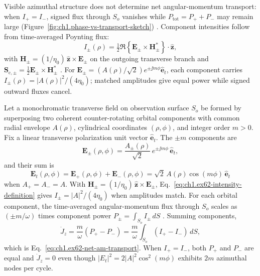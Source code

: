 Visible azimuthal structure does not determine net angular-momentum transport: when \(I_+=I_-\), signed flux through $S_o$ vanishes while $P_{\mathrm{tot}}=P_++P_-$ may remain large (Figure~\ref{fig:ch1.phase-vs-transport-sketch}) \cite{beth1936,stratton1941}. Component intensities follow from time-averaged Poynting flux:
\begin{equation}
\label{eq:ch1.ex62-intensity-definition}
I_\pm(\rho)=\tfrac12\Re\!\left\{\mathbf{E}_\pm\times\mathbf{H}_\pm^*\right\}\cdot\hat{\mathbf{z}},
\end{equation}
with $\mathbf{H}_\pm=(1/\eta_0)\,\hat{\mathbf{z}}\times\mathbf{E}_\pm$ on the outgoing
transverse branch and $\mathbf{S}_{\mathrm{c},\pm}=\tfrac12\mathbf{E}_\pm\times\mathbf{H}_\pm^*$ \cite{stratton1941}. For
$\mathbf{E}_\pm=(A(\rho)/\sqrt{2})e^{\pm\jj m\phi}\hat{\mathbf{e}}_t$, each component carries
$I_\pm(\rho)=|A(\rho)|^2/(4\eta_0)$; matched amplitudes give equal power while signed outward fluxes cancel.

Let a monochromatic transverse field on observation surface \(S_o\) be formed by
superposing two coherent counter-rotating orbital components with common radial
envelope \(A(\rho)\), cylindrical coordinates \((\rho,\phi)\), and integer order
\(m>0\). Fix a linear transverse polarization unit vector \(\hat{\mathbf{e}}_t\). The
\(\pm m\) components are
\begin{equation}
\label{eq:ch1.ex62-counter-rotating-components}
\mathbf{E}_\pm(\rho,\phi)=\frac{A_\pm(\rho)}{\sqrt{2}}\,e^{\pm\jj m\phi}\,\hat{\mathbf{e}}_t,
\end{equation}
and their sum is
\begin{equation}
\label{eq:ch1.ex62-counter-rotating-superposition}
\mathbf{E}_t(\rho,\phi)
=
\mathbf{E}_+(\rho,\phi)+\mathbf{E}_-(\rho,\phi)
=
\sqrt{2}\,A(\rho)\cos(m\phi)\,\hat{\mathbf{e}}_t
\end{equation}
when \(A_+=A_-=A\). With \(\mathbf{H}_\pm=(1/\eta_0)\,\hat{\mathbf{z}}\times\mathbf{E}_\pm\), Eq.~\eqref{eq:ch1.ex62-intensity-definition} gives \(I_\pm=|A|^2/(4\eta_0)\) when amplitudes match. For each orbital component, the time-averaged angular-momentum flux through \(S_o\)
scales as \((\pm m/\omega)\) times component power
\(P_\pm = \int_{S_o} I_\pm\,dS\) \cite{stratton1941}. Summing components,
\begin{equation}
\label{eq:ch1.ex62-channel-sum}
\dot J_z
=
\frac{m}{\omega}(P_+ - P_-)
=
\frac{m}{\omega}\int_{S_o}(I_+-I_-)\,dS,
\end{equation}
which is Eq.~\eqref{eq:ch1.ex62-net-am-transport}. When \(I_+=I_-\), both \(P_+\) and
\(P_-\) are equal and \(\dot J_z=0\) even though \(|E_t|^2 = 2|A|^2\cos^2(m\phi)\)
exhibits \(2m\) azimuthal nodes per cycle.

